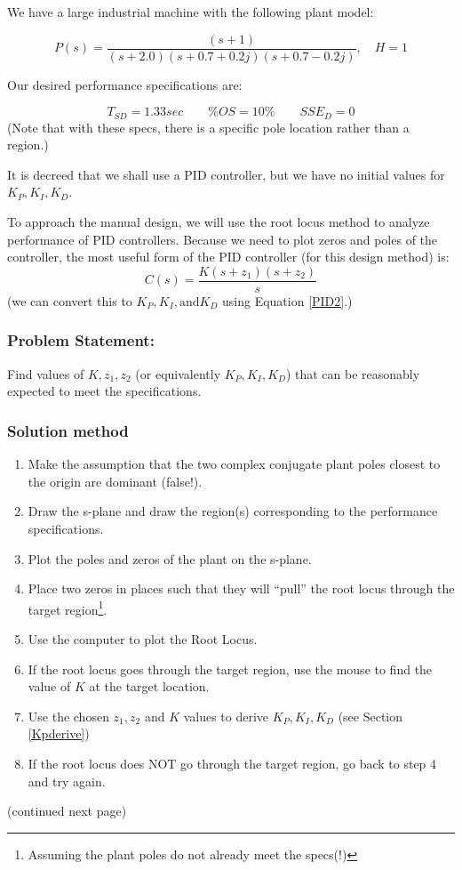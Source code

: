 \begin{Example}\label{ExampLargeIndustrialPlant}
We have a large industrial machine with the following plant model:

\[
P(s) = \frac {(s+1)} {(s+2.0)(s+0.7+0.2j)(s+0.7-0.2j)}, \quad H=1
\]


Our desired performance specifications are:

\[
T_{SD} = 1.33 sec  \qquad
\%OS = 10\%        \qquad
SSE_D = 0
\]
(Note that with these specs, there is a specific pole location rather than a region.)

It is decreed that we shall use a PID controller, but we have no initial values for $K_P, K_I, K_D$.

To approach the manual design, we will use the root locus method to analyze performance of PID controllers.  Because we need to plot zeros and poles of the controller,  the most useful form of the PID controller (for this design method) is:
\[
C(s) = \frac{K(s+z_1)(s+z_2)}{s}
\]
(we can convert this to $K_P, K_I, \mathrm{and} K_D$ using Equation \ref{PID2}.)

\subsubsection*{Problem Statement: }  Find values of $K, z_1, z_2$ (or equivalently $K_P, K_I, K_D$) that can be reasonably expected to meet the specifications.

\subsubsection*{Solution method}
\begin{enumerate}
 \item Make the assumption that the two complex conjugate plant poles closest to the origin are dominant (false!).
 \item Draw the s-plane and draw the region(s) corresponding to the performance specifications.
 \item Plot the poles and zeros of the plant on the s-plane.
 \item Place two zeros in places such that they will ``pull'' the root locus through the target region\footnote{Assuming the plant poles do not already meet the specs(!)}.

  \item Use the computer to plot the Root Locus.
  \item If the root locus goes through the target region, use the mouse to find the value of $K$ at the target location.
  \item Use the chosen $z_1, z_2$ and $K$ values to derive  $K_P, K_I, K_D$ (see Section \ref{Kpderive})
  \item If the root locus does NOT go through the target region, go back to step 4 and try again.
\end{enumerate}
%
(continued next page)
\end{Example}
%


